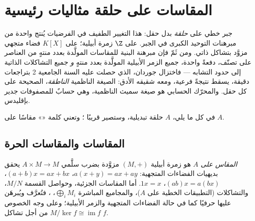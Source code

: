 \chapter{المقاسات على حلقة مثاليات رئيسية}\label{ch:b3:modules}

جبر خطي على \emph{حلقة} بدل حقل: هذا التغيير الطفيف في الفرضيات
يُنتج واحدة من مبرهنات التوحيد الكبرى في الجبر.  على $\Z$
زمرة أبيلية؛  على $K[X]$ فضاء متجهي مزوَّد بتشاكل ذاتي. ومن
ثَمّ فإن مبرهنة البنية للمقاسات المولَّدة بعدد منتهٍ من العناصر على
 تصنّف، دفعةً واحدة، جميع الزمر الأبيلية
المولَّدة بعدد منتهٍ \emph{و} جميع التشاكلات الذاتية إلى حدود
التشابه --- فاختزال جوردان، الذي حصلت عليه السنة الجامعية 2
بتراجعات دقيقة، يسقط نتيجةً فرعية، ومعه شقيقه الأدق: الصيغة
الناظمية \emph{الناطقة}، الصحيحة على كل حقل. والمحرّك الحسابي هو
صيغة سميث الناظمية، وهي حسابٌ للمصفوفات جدير بإقليدس.

في كل ما يلي، $A$ حلقة تبديلية، وستصير قريبًا ؛
وتعني كلمة «» مقاسًا على $A$.

\section{المقاسات والمقاسات الحرة}

\begin{definition}\label{def:b3:modules:module}
\emph{المقاس على $A$} هو زمرة أبيلية $(M, +)$ مزوَّدة
بضرب سلَّمي $A \times M \to M$ يحقق بديهيات الفضاءات المتجهية: $a(x + y) = ax + ay$، $(a + b)x = ax + bx$،
$(ab)x = a(bx)$، $1x = x$. أما المقاسات الجزئية، وحواصل القسمة
$M/N$، والتشاكلات (التطبيقات الخطية على $A$)، والمجاميع المباشرة
$\bigoplus_i M_i$، ، فتُعرَّف ويُبرهَن عليها حرفيًا كما في حالة
الفضاءات المتجهية والزمر الأبيلية؛ وعلى وجه الخصوص $M/\ker f \cong
\operatorname{im} f$ من أجل
تشاكل $f$.
\end{definition}

